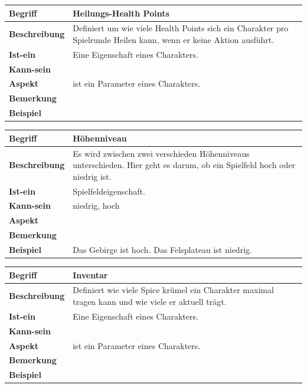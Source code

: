 \documentclass[12pt]{article}
\begin{document}
\begin{tabularx}{\linewidth}{|l|X|}
\hline
\textbf{Begriff} & \textbf{Heilungs-Health Points } \\
\hline
\textbf{Beschreibung} & Definiert um wie viele Health Points sich ein Charakter pro Spielrunde Heilen kann, wenn er keine Aktion ausführt. \\
\hline
\textbf{Ist-ein} & Eine Eigenschaft eines Charakters.\\
\hline
\textbf{Kann-sein} & \\
\hline
\textbf{Aspekt} & ist ein Parameter eines Charakters. \\
\hline
\textbf{Bemerkung} & \\
\hline
\textbf{Beispiel} &  \\
\hline
\end{tabularx}

\begin{tabularx}{\linewidth}{|l|X|}
\hline
\textbf{Begriff} & \textbf{Höhenniveau} \\
\hline
\textbf{Beschreibung} & Es wird zwischen zwei verschieden Höhenniveaus unterschieden. Hier geht es darum, ob ein Spielfeld hoch oder niedrig ist. \\
\hline
\textbf{Ist-ein} & Spielfeldeigenschaft. \\
\hline
\textbf{Kann-sein} & niedrig, hoch\\
\hline
\textbf{Aspekt} &  \\
\hline
\textbf{Bemerkung} &  \\
\hline
\textbf{Beispiel} & Das Gebirge ist hoch. Das Felsplateau ist niedrig. \\
\hline
\end{tabularx}

\begin{tabularx}{\linewidth}{|l|X|}
\hline
\textbf{Begriff} & \textbf{Inventar} \\
\hline
\textbf{Beschreibung} & Definiert wie viele Spice krümel ein Charakter maximal tragen kann und wie viele er aktuell trägt. \\
\hline
\textbf{Ist-ein} & Eine Eigenschaft eines Charakters.\\
\hline
\textbf{Kann-sein} & \\
\hline
\textbf{Aspekt} & ist ein Parameter eines Charakters. \\
\hline
\textbf{Bemerkung} & \\
\hline
\textbf{Beispiel} &  \\
\hline
\end{tabularx}
\end{document}
